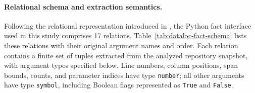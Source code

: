 \paragraph*{Relational schema and extraction semantics.}
Following the relational representation introduced in , the Python fact interface used in this study comprises 17 relations. Table~\ref{tab:dataloc-fact-schema} lists these relations with their original argument names and order. Each relation contains a finite set of tuples extracted from the analyzed repository snapshot, with argument types specified below. Line numbers, column positions, span bounds, counts, and parameter indices have type \texttt{number}; all other arguments have type \texttt{symbol}, including Boolean flags represented as \texttt{True} and \texttt{False}.


